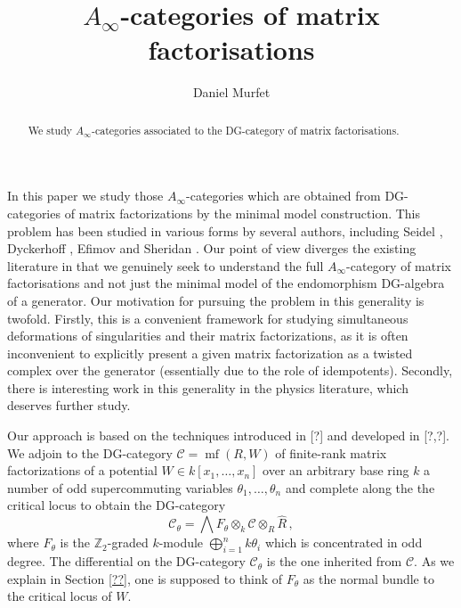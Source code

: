 \documentclass[english,letter paper,12pt,leqno]{article}
\theoremstyle{example}
\numberwithin{equation}{section}
\def\res{\operatorname{Res}}
\def\nZ{\mathds{Z}}
\DeclareMathOperator{\mf}{mf}
\begin{document}
\def\Res{\res\!}
\newcommand{\ud}{\mathrm{d}}
\newcommand{\Ress}[1]{\res_{#1}\!}
\newcommand{\cat}[1]{\mathcal{#1}}
\newcommand{\lto}{\longrightarrow}
\newcommand{\xlto}[1]{\stackrel{#1}\lto}
\newcommand{\md}[1]{\mathscr{#1}}
\def\sus{\l}
\def\l{\,|\,}
\def\sgn{\textup{sgn}}
\def\samp{\zeta}
\def\Samp{Z}
\def\traff{N}

\title{$A_\infty$-categories of matrix factorisations}
\author{Daniel Murfet}

\maketitle

\begin{abstract}
We study $A_\infty$-categories associated to the DG-category of matrix factorisations.
\end{abstract}


In this paper we study those $A_\infty$-categories which are obtained from DG-categories of matrix factorizations by the minimal model construction. This problem has been studied in various forms by several authors, including Seidel \cite{??}, Dyckerhoff \cite{??}, Efimov \cite{??} and Sheridan \cite{??}. Our point of view diverges the existing literature in that we genuinely seek to understand the full $A_\infty$-category of matrix factorisations and not just the minimal model of the endomorphism DG-algebra of a generator. Our motivation for pursuing the problem in this generality is twofold. Firstly, this is a convenient framework for studying simultaneous deformations of singularities and their matrix factorizations, as it is often inconvenient to explicitly present a given matrix factorization as a twisted complex over the generator (essentially due to the role of idempotents). Secondly, there is interesting work in this generality in the physics literature, which deserves further study.

Our approach is based on the techniques introduced in [?] and developed in [?,?]. We adjoin to the DG-category $\md{C} = \mf(R,W)$ of finite-rank matrix factorizations of a potential $W \in k[x_1,\ldots,x_n]$ over an arbitrary base ring $k$ a number of odd supercommuting variables $\theta_1,\ldots,\theta_n$ and complete along the the critical locus to obtain the DG-category
\[
\md{C}_\theta = \bigwedge F_\theta \otimes_k \md{C} \otimes_R \widehat{R}\,,
\]
where $F_\theta$ is the $\nZ_2$-graded $k$-module $\bigoplus_{i=1}^n k \theta_i$ which is concentrated in odd degree. The differential on the DG-category $\md{C}_\theta$ is the one inherited from $\mathscr{C}$. As we explain in Section \ref{??}, one is supposed to think of $F_\theta$ as the normal bundle to the critical locus of $W$.
\end{document}
